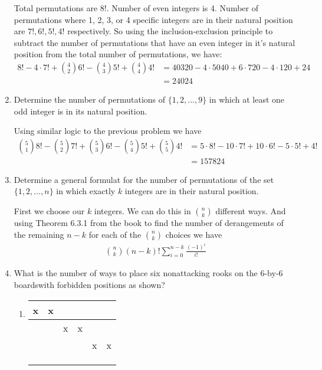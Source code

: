 \documentclass{article}
\begin{document}
\begin{enumerate}
Total permutations are 8!. Number of even integers is 4. Number of permutations where 1, 2, 3, or 4 specific integers are in their natural position are $7!, 6!, 5!, 4!$ respectively. So using the inclusion-exclusion principle to subtract the number of permutations that have an even integer in it's natural position from the total number of permutations, we have:
\begin{align*}
  8!-4\cdot7!+\binom{4}{2}6!-\binom{4}{3}5!+\binom{4}{4}4!&=40320-4\cdot5040+6\cdot720-4\cdot120+24\\
  &=24024
\end{align*}
\setcounter{enumi}{12}
\item
Determine the number of permutations of $\{1,2,\dots,9\}$ in which at least one odd integer is in its natural position.

Using similar logic to the previous problem we have
\begin{align*}
  \binom{5}{1}8!-\binom{5}{2}7!+\binom{5}{3}6!-\binom{5}{4}5!+\binom{5}{5}4!&=5\cdot8!-10\cdot7!+10\cdot6!-5\cdot5!+4!\\
  &=157824
\end{align*}
\item
Determine a general formulat for the number of permutations of the set $\{1,2,\dots,n\}$ in which exactly $k$ integers are in their natural position.

First we choose our $k$ integers. We can do this in $\binom{n}{k}$ different ways. And using Theorem 6.3.1 from the book to find the number of derangements of the remaining $n-k$ for each of the $\binom{n}{k}$ choices we have
\begin{align*}
  \binom{n}{k}(n-k)!\sum\limits_{i=0}^{n-k}{\frac{(-1)^i}{i!}}
\end{align*}
\setcounter{enumi}{23}
\item
What is the number of ways to place six nonattacking rooks on the 6-by-6 boardswith forbidden positions as shown?
\begin{enumerate}
\item
\begin{tabular}{|c|c|c|c|c|c|}
\hline
x&x&&&&\\
\hline
&&x&x&&\\
\hline
&&&&x&x\\
\hline
&&&&&\\
\hline
&&&&&\\
\hline
&&&&&\\
\hline
\end{tabular}


\end{enumerate}
\end{enumerate}
\end{document}
